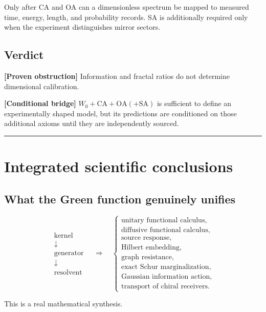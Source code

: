 \documentclass[11pt,a4paper,openany]{report}
\begin{document}
Only after CA and OA can a dimensionless spectrum be mapped to measured time, energy, length, and probability records. SA is additionally required only when the experiment distinguishes mirror sectors.

\section{Verdict}

\textbf{[Proven obstruction]} Information and fractal ratios do not determine dimensional calibration.

\textbf{[Conditional bridge]} \(W_0+\mathrm{CA}+\mathrm{OA}(+\mathrm{SA})\) is sufficient to define an experimentally shaped model, but its predictions are conditioned on those additional axioms until they are independently sourced.

\par\medskip\hrule\medskip

\chapter{Integrated scientific conclusions}

\section{What the Green function genuinely unifies}

\[
\begin{array}{c}
\text{kernel}\\
\downarrow\\
\text{generator}\\
\downarrow\\
\text{resolvent}
\end{array}
\quad\Longrightarrow\quad
\left\{
\begin{array}{l}
\text{unitary functional calculus},\\
\text{diffusive functional calculus},\\
\text{source response},\\
\text{Hilbert embedding},\\
\text{graph resistance},\\
\text{exact Schur marginalization},\\
\text{Gaussian information action},\\
\text{transport of chiral receivers}.
\end{array}
\right.
\]

This is a real mathematical synthesis.
\end{document}
